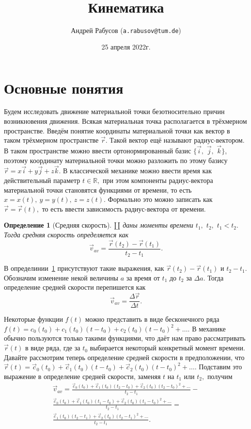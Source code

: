\documentclass[a5paper,11pt]{article}
\title{Кинематика}
\author{Андрей Рабусов (\texttt{a.rabusov@tum.de})}
\date{25 апреля 2022г.}
\newtheorem{definition}{Определение}
\begin{document}
\maketitle
\section{Основные понятия}
Будем исследовать движение материальной точки безотносительно
причин возникновения движения. Всякая материальная точка располагается в
трёхмерном пространстве. Введём понятие координаты материальной точки
как вектор в таком трёхмерном пространстве $\vec{r}$. Такой вектор ещё называют
радиус-вектором. В таком пространстве можно ввести ортонормированный базис
$\{\vec{i},$ $\vec{j},$ $\vec{k}\}$,
поэтому координату материальной точки можно разложить по этому базису
$\vec{r} = x\vec{i}+y\vec{j}+z\vec{k}.$ В классической механике 
можно ввести время как действительный параметр $t\in\mathbb{R},$
при этом компоненты радиус-вектора материальной точки становятся
функциями от времени, то есть $x = x(t),~y=y(t),~z=z(t).$
Формально это можно записать как $\vec{r} = \vec{r} (t),$ то есть
ввести зависимость радиус-вектора от времени.
\begin{definition}[Средняя скорость]
$\amalg$ даны моменты времени $t_1,$ $t_2,$ $t_1 < t_2.$
Тогда средняя скорость определяется как
$$\vec{v}_{av} = \frac{\vec{r}(t_2)-\vec{r}(t_1)}{t_2-t_1}.$$
\label{def:mean_speed}
\end{definition}
В определинии~\ref{def:mean_speed} присутствуют такие выражения, как
$\vec{r}(t_2)-\vec{r}(t_1)$ и $t_2 - t_1.$ Обозначим изменение некой
величины $a$ за время от $t_1$ до $t_2$ за $\Delta a.$ Тогда определение
средней скорости перепишется как $$\vec{v}_{av} = \frac {\Delta \vec{r}}{\Delta t}.$$
\par
Некоторые функции $f(t)$ можно представить в виде бесконечного ряда
$f(t) = c_0(t_0)+c_1(t_0) (t-t_0) + c_2(t_0) (t-t_0)^2 + \ldots.$ В механике обычно
пользуются только такими функциями, что даёт нам право рассматривать $\vec{r}(t)$
в виде ряда, где за $t_0$ выбирается некоторый конкретный момент времени.
Давайте рассмотрим теперь определение средней скорости в предположении,
что
$\vec{r}(t) = \vec{c}_0(t_0) +\vec{c}_1(t_0) (t-t_0) + \vec{c}_2(t_0) (t-t_0)^2+\ldots.$
Подставим это выражение в определение средней скорости, заменяя $t$ на $t_1$ или $t_2,$
получим
\begin{multline*}
\vec{v}_{av} =
 \frac{\vec{c}_0(t_0) +\vec{c}_1(t_0) (t_2-t_0) + \vec{c}_2(t_0) (t_2-t_0)^2+\ldots}{t_2-t_1}-\\
 \frac{\vec{c}_0(t_0) +\vec{c}_1(t_0) (t_1-t_0) + \vec{c}_2(t_0) (t_1-t_0)^2+\ldots}{t_2-t_1}=\\
 \frac{\vec{c}_1(t_0) (t_2-t_1) + \vec{c}_2(t_0) (t_2-t_1)^2+\ldots}{t_2-t_1}.
\end{multline*}
\end{document}
